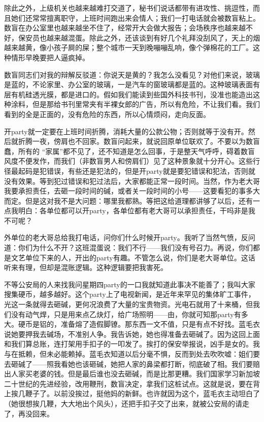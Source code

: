 除此之外，上级机关也越来越难打交道了，秘书们说话都带有进攻性、挑逗性，而且她们还常常擅离职守，上班时间跑出来会情人；我们一打电话就会被数盲粘上。数盲在办公室里也越来越坐不住了，经常开大会做大报告；会场秩序也越来越不好，保安员也越来越混蛋。除此之外，还该谈到有好几个礼拜没刮风了，天上的烟越来越黄，像小孩子屙的屎；整个城市一天到晚嘣嘣乱响，像个弹棉花的工厂。这种情形早晚要把人逼疯掉。 

数盲同志们对我的辩解反驳道：你说天是黄的？我怎么没看见？对他们来说，玻璃是蓝的，不论家里、办公室的玻璃，一是汽车的窗玻璃都是蓝的。这种玻璃表面有层有机硅透光膜，都是进口的。假如我们能读到些国外科技书刊，没准也能造出这种涂料，但是那给书刊里常夹有半裸女郎的广告，所以有危险，不让我们看。我们看到的全是正面的，没有危险的东西，所以心情烦闷，走向反面。 



开party就一定要在上班时间折腾，消耗大量的公款公物；否则就等于没有开。然后就折腾一夜，傍肩也不回家。数盲问起来，就说回原单位联欢了。不要以为数盲蠢，所有的 “家属”都不见了，还不知道是怎么回事，于是整天气呼呼，碍着数盲风度不便发作，而我们（非数盲男人和傍肩们）见了这种景象就十分开心。这些行径最起码是犯错误，有些还是犯法的，但是开party就是要犯错误和犯法，否则就没有效果。等到犯过错误和犯过法后，大家都能正常一段时间。当然，作为老大哥我要承担责任，去砸一段时间的碱，或者关一段时间的小号——这要看犯的事多大而定。但是这对我不是大问题：哪里我都熟。等把这给道理都讲够了以后，还有一点我明白：各单位都可以开party，各单位都有老大哥可以承担责任，干吗非是我不可呢？ 

外单位的老大哥总给我打电话，问你们什么时候开party。我听了当然气愤，反问道：你们为什么不开？这班混蛋说：我们不行——我们没有号召力。再说，你们都是文艺单位下来的人，开出的party有趣。不管怎么说，你们是老大哥单位。这话听来有理，但却是混账逻辑。这种逻辑要把我害死。 

不等公安局的人来找我问星期四party的一口我就知道此事决不能善了；我叫大家搜集硬币，越多越好。这个party上了电视新闻，是近年来罕见的集体旷工事件，光这一条就得去砸碱，更何况浪费了大量的宝贵物资。光电石就用了十来桶，但我们没有动气焊，只是用来点乙炔灯，给广场照明——由，你就可知那party有多大。硬币是铝的，准备熔了造假脚镣。那东西一文不值，只是有点不好找。蓝毛衣说她要押我去碱场，不准别人争。我告诉她，她也得准备去砸碱了。因为这回上面和我们算总账，连打架用手扣子的一叩发了。挨打的保安举报说，凶手是女的。我与在抵赖，但未必能赖掉。蓝毛衣知道以后分毫不惧，反而到处去吹吹嘘：姐们要去砸碱了——照我看她也该砸碱，她把人家的鼻梁都打断，彻底破了相。我们要赔出人家买老婆的钱。但是最后谁也没去砸碱，而是比那更糟。我们国家学习新加坡二十世纪的先进经验，改用鞭刑，数盲决定，拿我们这桩试点。这就是说，要在背上挨几鞭子了。以前没挨过，挺他妈的新鲜。也许就因为这个，蓝毛衣主动坦白了（她很想挨几鞭，大大地出个风头），还把手扣子交了出来，就被公安局的请走了，再没回来。 

